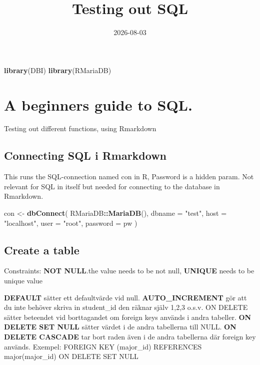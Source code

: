\documentclass[
]{article}
\title{Testing out SQL}
\author{}
\date{\vspace{-2.5em}2026-08-03}
\newenvironment{Shaded}{\begin{snugshade}}{\end{snugshade}}
\newcommand{\AttributeTok}[1]{\textcolor[rgb]{0.13,0.29,0.53}{#1}}
\newcommand{\FunctionTok}[1]{\textcolor[rgb]{0.13,0.29,0.53}{\textbf{#1}}}
\newcommand{\NormalTok}[1]{#1}
\newcommand{\OtherTok}[1]{\textcolor[rgb]{0.56,0.35,0.01}{#1}}
\newcommand{\SpecialCharTok}[1]{\textcolor[rgb]{0.81,0.36,0.00}{\textbf{#1}}}
\newcommand{\StringTok}[1]{\textcolor[rgb]{0.31,0.60,0.02}{#1}}
\begin{document}
\maketitle

\begin{Shaded}
\begin{Highlighting}[]
\FunctionTok{library}\NormalTok{(DBI) }
\FunctionTok{library}\NormalTok{(RMariaDB)}
\end{Highlighting}
\end{Shaded}

\section{A beginners guide to SQL.}\label{a-beginners-guide-to-sql.}

Testing out different functions, using Rmarkdown

\subsection{Connecting SQL i
Rmarkdown}\label{connecting-sql-i-rmarkdown}

This runs the SQL-connection named con in R, Password is a hidden param.
Not relevant for SQL in itself but needed for connecting to the database
in Rmarkdown.

\begin{Shaded}
\begin{Highlighting}[]
\NormalTok{con }\OtherTok{\textless{}{-}} \FunctionTok{dbConnect}\NormalTok{(}
\NormalTok{  RMariaDB}\SpecialCharTok{::}\FunctionTok{MariaDB}\NormalTok{(),}
  \AttributeTok{dbname =} \StringTok{"test"}\NormalTok{,}
  \AttributeTok{host =} \StringTok{"localhost"}\NormalTok{,}
  \AttributeTok{user =} \StringTok{"root"}\NormalTok{,}
  \AttributeTok{password =}\NormalTok{ pw}
\NormalTok{)}
\end{Highlighting}
\end{Shaded}

\subsection{Create a table}\label{create-a-table}

Constraints: \textbf{NOT NULL}.the value needs to be not null,
\textbf{UNIQUE} needs to be unique value

\textbf{DEFAULT} sätter ett defaultvärde vid null.
\textbf{AUTO\_INCREMENT} gör att du inte behöver skriva in student\_id
den räknar själv 1,2,3 o.s.v. ON DELETE sätter beteendet vid
borttagandet om foreign keys används i andra tabeller. \textbf{ON DELETE
SET NULL} sätter värdet i de andra tabellerna till NULL. \textbf{ON
DELETE CASCADE} tar bort raden även i de andra tabellerna där foreign
key används. Exempel: FOREIGN KEY (major\_id) REFERENCES
major(major\_id) ON DELETE SET NULL
\end{document}
